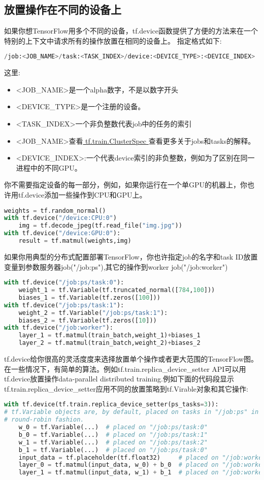 \subsection{放置操作在不同的设备上}
如果你想TensorFlow用多个不同的设备，tf.device函数提供了方便的方法来在一个特别的上下文中请求所有的操作放置在相同的设备上。
指定格式如下:
\begin{lstlisting}[language=Python]
/job:<JOB_NAME>/task:<TASK_INDEX>/device:<DEVICE_TYPE>:<DEVICE_INDEX>
\end{lstlisting}
这里:
\begin{itemize}
\item <JOB\_NAME>是一个alpha数字，不是以数字开头
\item <DEVICE\_TYPE>是一个注册的设备。
\item <TASK\_INDEX>一个非负整数代表job中的任务的索引
\item <JOB\_NAME>查看\href{https://www.tensorflow.org/api_docs/python/tf/train/ClusterSpec?hl=zh-cn}{ tf.train.ClusterSpec }查看更多关于jobs和tasks的解释。
\item <DEVICE\_INDEX>:一个代表device索引的非负整数，例如为了区别在同一进程中的不同GPU。
\end{itemize}
你不需要指定设备的每一部分，例如，如果你运行在一个单GPU的机器上，你也许用tf.device添加一些操作到CPU和GPU上。
\begin{lstlisting}[language=Python]
weights = tf.random_normal()
with tf.device("/device:CPU:0")
    img = tf.decode_jpeg(tf.read_file("img.jpg"))
with tf.device("/device:GPU:0"):
    result = tf.matmul(weights,img)
\end{lstlisting}
如果你用典型的分布式配置部署TensorFlow，你也许指定job的名字和task ID放置变量到参数服务器job("/job:ps"),其它的操作到worker job("/job:worker")
\begin{lstlisting}[language=Python]
with tf.device("/job:ps/task:0"):
    weight_1 = tf.Variable(tf.truncated_normal([784,100]))
    biases_1 = tf.Variable(tf.zeros([100]))
with tf.device("/job:ps/task:1"):
    weight_2 = tf.Variable("/job:ps/task:1"):
    biases_2 = tf.Variable(tf.zeros([10]))
with tf.device("/job:worker"):
    layer_1 = tf.matmul(train_batch,weight_1)+biases_1
    layer_2 = tf.matmul(train_batch,weight_2)+biases_2
\end{lstlisting}
tf.device给你很高的灵活度度来选择放置单个操作或者更大范围的TensorFlow图。在一些情况下，有简单的算法。例如tf.train.replica\_device\_setter API可以用tf.device放置操作data-parallel distributed training.例如下面的代码段显示tf.train.replica\_device\_setter应用不同的放置策略到tf.Virable对象和其它操作:
\begin{lstlisting}[language=Python]
with tf.device(tf.train.replica_device_setter(ps_tasks=3)):
# tf.Variable objects are, by default, placed on tasks in "/job:ps" in a
# round-robin fashion.
    w_0 = tf.Variable(...)  # placed on "/job:ps/task:0"
    b_0 = tf.Variable(...)  # placed on "/job:ps/task:1"
    w_1 = tf.Variable(...)  # placed on "/job:ps/task:2"
    b_1 = tf.Variable(...)  # placed on "/job:ps/task:0"
    input_data = tf.placeholder(tf.float32)     # placed on "/job:worker"
    layer_0 = tf.matmul(input_data, w_0) + b_0  # placed on "/job:worker"
    layer_1 = tf.matmul(input_data, w_1) + b_1  # placed on "/job:worker"
\end{lstlisting}
